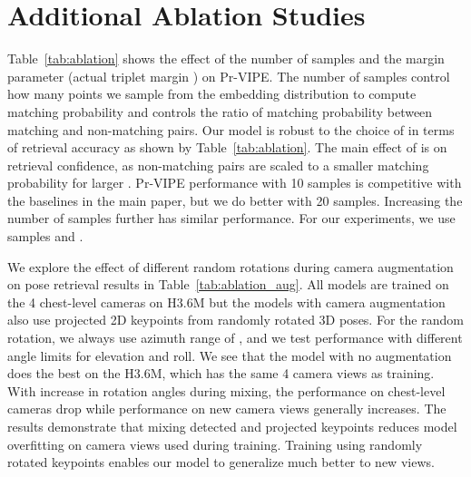 \section{Additional Ablation Studies}\label{sec:ablation}

 Table~\ref{tab:ablation} shows the effect of the number of samples  and the margin parameter  (actual triplet margin ) on Pr-VIPE. The number of samples control how many points we sample from the embedding distribution to compute matching probability and  controls the ratio of matching probability between matching and non-matching pairs. Our model is robust to the choice of  in terms of retrieval accuracy as shown by Table~\ref{tab:ablation}. The main effect of  is on retrieval confidence, as non-matching pairs are scaled to a smaller matching probability for larger . Pr-VIPE performance with 10 samples is competitive with the baselines in the main paper, but we do better with 20 samples. Increasing the number of samples further has similar performance. For our experiments, we use  samples and .

\begin{table}
  \centering
  \caption{Additional ablation study results of Pr-VIPE on H3.6M with the number of samples  and margin parameter .} \label{tab:ablation}
\end{table}

 We explore the effect of different random rotations during camera augmentation on pose retrieval results in Table~\ref{tab:ablation_aug}. All models are trained on the 4 chest-level cameras on H3.6M but the models with camera augmentation also use projected 2D keypoints from randomly rotated 3D poses. For the random rotation, we always use azimuth range of , and we test performance with different angle limits for elevation and roll. We see that the model with no augmentation does the best on the H3.6M, which has the same 4 camera views as training. With increase in rotation angles during mixing, the performance on chest-level cameras drop while performance on new camera views generally increases. The results demonstrate that mixing detected and projected keypoints reduces model overfitting on camera views used during training. Training using randomly rotated keypoints enables our model to generalize much better to new views.

